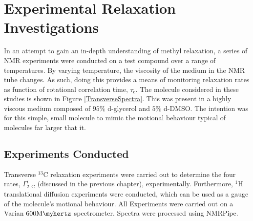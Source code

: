 
\chapter{Experimental Relaxation Investigations}
In an attempt to gain an in-depth understanding of methyl relaxation, a series of NMR experiments were conducted on a test compound over a range of temperatures. By varying temperature, the viscosity of the medium in the NMR tube changes. As such, doing this provides a means of monitoring relaxation rates as function of rotational correlation time, $\tau_{\text{c}}$. The molecule considered in these studies is shown in Figure \ref{TransverseSpectra}. This was present in a highly viscous medium composed of $95 \%$ d-glycerol and $5 \%$ d-DMSO. The intention was for this simple, small molecule to mimic the motional behaviour typical of molecules far larger that it.
\section{Experiments Conducted}
Transverse $^{13}$C relaxation experiments were carried out to determine the four rates, $\Gamma_{2,\text{C}}^{i}$ (discussed in the previous chapter), experimentally. Furthermore, $^1$H translational diffusion experiments were conducted, which can be used as a gauge of the molecule's motional behaviour. All Experiments were carried out on a Varian $\num{600} \si{\mega \myhertz}$ spectrometer. Spectra were processed using NMRPipe\cite{RN43}.\\
